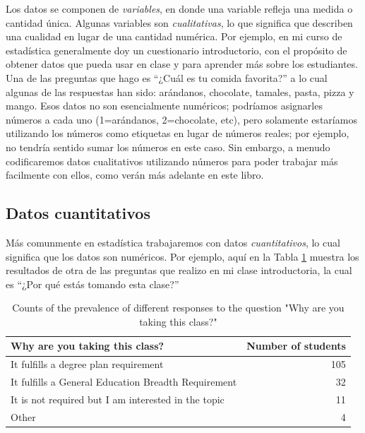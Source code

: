 \documentclass[
  12pt,
]{book}
\theoremstyle{definition}
\theoremstyle{definition}
\theoremstyle{definition}
\theoremstyle{remark}
\begin{document}
Los datos se componen de \emph{variables}, en donde una variable refleja una medida o cantidad única. Algunas variables son \emph{cualitativas}, lo que significa que describen una cualidad en lugar de una cantidad numérica. Por ejemplo, en mi curso de estadística generalmente doy un cuestionario introductorio, con el propósito de obtener datos que pueda usar en clase y para aprender más sobre los estudiantes. Una de las preguntas que hago es ``¿Cuál es tu comida favorita?'' a lo cual algunas de las respuestas han sido: arándanos, chocolate, tamales, pasta, pizza y mango. Esos datos no son esencialmente numéricos; podríamos asignarles números a cada uno (1=arándanos, 2=chocolate, etc), pero solamente estaríamos utilizando los números como etiquetas en lugar de números reales; por ejemplo, no tendría sentido sumar los números en este caso. Sin embargo, a menudo codificaremos datos cualitativos utilizando números para poder trabajar más facilmente con ellos, como verán más adelante en este libro.

\hypertarget{datos-cuantitativos}{%
\subsection{Datos cuantitativos}\label{datos-cuantitativos}}

Más comunmente en estadística trabajaremos con datos \emph{cuantitativos}, lo cual significa que los datos son numéricos. Por ejemplo, aquí en la Tabla \ref{tab:WhyTakingClass} muestra los resultados de otra de las preguntas que realizo en mi clase introductoria, la cual es ``¿Por qué estás tomando esta clase?''

\begin{table}

\caption{\label{tab:WhyTakingClass}Counts of the prevalence of different responses to the question "Why are you taking this class?"}
\centering
\begin{tabular}[t]{lr}
\toprule
Why are you taking this class? & Number of students\\
\midrule
It fulfills a degree plan requirement & 105\\
It fulfills a General Education Breadth Requirement & 32\\
It is not required but I am interested in the topic & 11\\
Other & 4\\
\bottomrule
\end{tabular}
\end{table}
\end{document}
